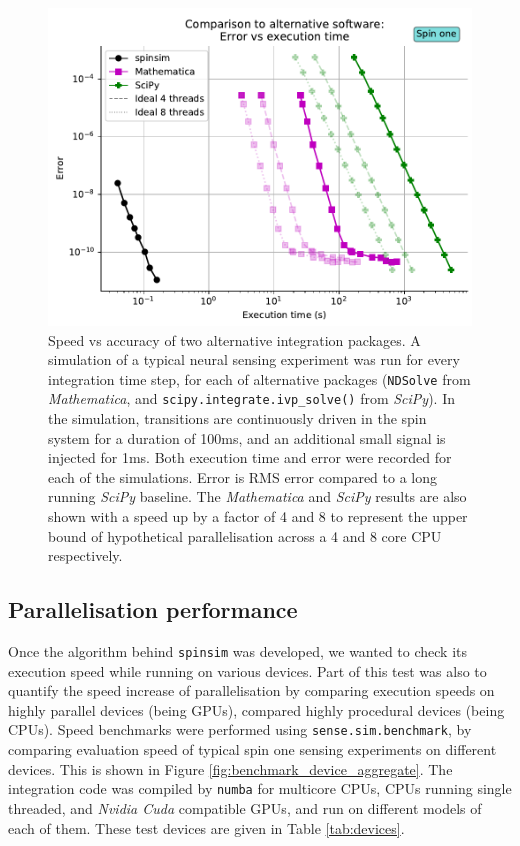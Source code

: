 \documentclass{jors}
\begin{document}
		\begin{figure}[h!]
			\includegraphics[scale=0.9]{benchmark_external_execution_error.pdf}
			\caption{Speed vs accuracy of two alternative integration packages. A simulation of a typical neural sensing experiment was run for every integration time step, for each of alternative packages (\texttt{NDSolve} from \emph{Mathematica}, and \texttt{scipy.integrate.ivp\_solve()} from \emph{SciPy}). In the simulation, transitions are continuously driven in the spin system for a duration of 100ms, and an additional small signal is injected for 1ms. Both execution time and error were recorded for each of the simulations. Error is RMS error compared to a long running \emph{SciPy} baseline. The \emph{Mathematica} and \emph{SciPy} results are also shown with a speed up by a factor of 4 and 8 to represent the upper bound of hypothetical parallelisation across a 4 and 8 core CPU respectively.}
			\label{fig:benchmark_external}
		\end{figure}

	\subsection{Parallelisation performance}
		Once the algorithm behind \texttt{spinsim} was developed, we wanted to check its execution speed while running on various devices. Part of this test was also to quantify the speed increase of parallelisation by comparing execution speeds on highly parallel devices (being GPUs), compared highly procedural devices (being CPUs). Speed benchmarks were performed using \texttt{sense.sim.benchmark}, by comparing evaluation speed of typical spin one sensing experiments on different devices. This is shown in Figure \ref{fig:benchmark_device_aggregate}. The integration code was compiled by \texttt{numba} for multicore CPUs, CPUs running single threaded, and \emph{Nvidia Cuda} compatible GPUs, and run on different models of each of them. These test devices are given in Table \ref{tab:devices}.
\end{document}
